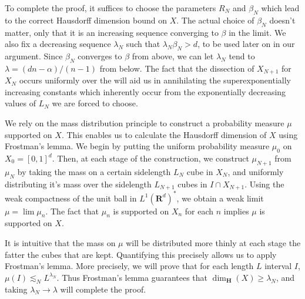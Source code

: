 \documentclass{article}
\theoremstyle{plain}
\theoremstyle{plain}
\begin{document}
\begin{multicols}{2}
To complete the proof, it suffices to choose the parameters $R_N$ and $\beta_N$ which lead to the correct Hausdorff dimension bound on $X$. The actual choice of $\beta_N$ doesn't matter, only that it is an increasing sequence converging to $\beta$ in the limit. We also fix a decreasing sequence $\lambda_N$ such that $\lambda_N \beta_N > d$, to be used later on in our argument. Since $\beta_N$ converges to $\beta$ from above, we can let $\lambda_N$ tend to $\lambda = (dn - \alpha)/(n - 1)$ from below. The fact that the dissection of $X_{N+1}$ for $X_N$ occurs uniformly over the will aid us in annihilating the superexponentially increasing constants which inherently occur from the exponentially decreasing values of $L_N$ we are forced to choose.

We rely on the mass distribution principle to construct a probability measure $\mu$ supported on $X$. This enables us to calculate the Hausdorff dimension of $X$ using Frostman's lemma. We begin by putting the uniform probability measure $\mu_0$ on $X_0 = [0,1]^d$. Then, at each stage of the construction, we construct $\mu_{N+1}$ from $\mu_N$ by taking the mass on a certain sidelength $L_N$ cube in $X_N$, and uniformly distributing it's mass over the sidelength $L_{N+1}$ cubes in $I \cap X_{N+1}$. Using the weak compactness of the unit ball in $L^1(\mathbf{R}^d)^*$, we obtain a weak limit $\mu = \lim \mu_n$. The fact that $\mu_n$ is supported on $X_n$ for each $n$ implies $\mu$ is supported on $X$.

It is intuitive that the mass on $\mu$ will be distributed more thinly at each stage the fatter the cubes that are kept. Quantifying this precisely allows us to apply Frostman's lemma. More precisely, we will prove that for each length $L$ interval $I$, $\mu(I) \lesssim_N L^{\lambda_N}$. Thus Frostman's lemma guarantees that $\dim_{\mathbf{H}}(X) \geq \lambda_N$, and taking $\lambda_N \to \lambda$ will complete the proof.


\end{multicols}
\end{document}
